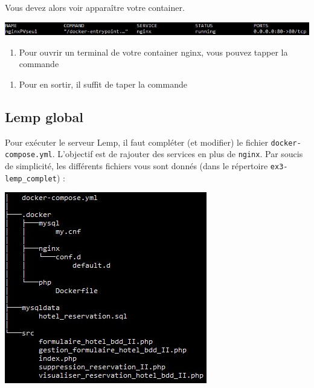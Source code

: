 \documentclass[french, 12pt]{article}%
\begin{document}
Vous devez alors voir apparaître votre container.

\begin{center}
\includegraphics[scale=0.7]{./ressource/resultat_ps.jpg}
\end{center}


\begin{enumerate}[resume]
\item Pour ouvrir un terminal de votre container nginx, vous pouvez tapper la commande  
\end{enumerate}

\begin{enumerate}[resume]
\item Pour en sortir, il suffit de taper la commande 
\end{enumerate}



\subsection{Lemp global}

Pour exécuter le serveur Lemp, il faut compléter (et modifier) le fichier \verb?docker-compose.yml?. L'objectif est de rajouter des services en plus de \verb?nginx?. Par soucis de simplicité, les différents fichiers vous sont donnés (dans le répertoire \verb?ex3-lemp_complet?) : 

\begin{center}
\includegraphics[scale=0.7]{./ressource/arbo_lemp}
\end{center}
\end{document}
